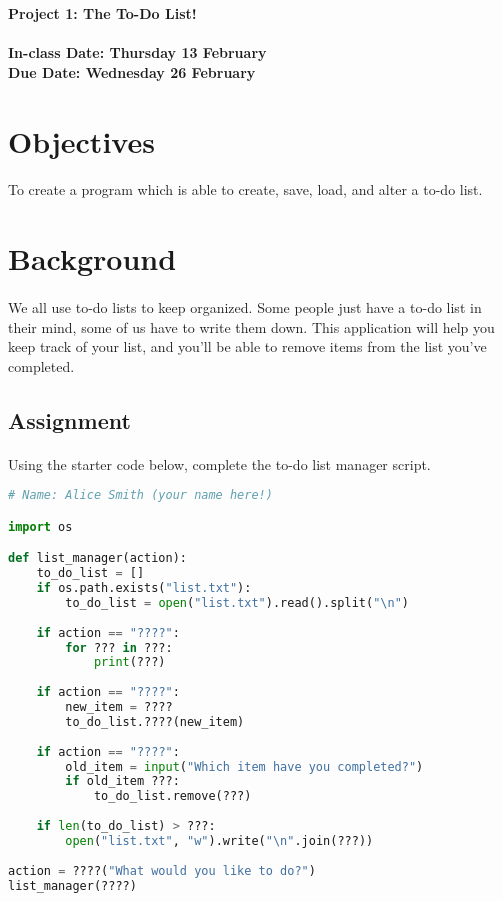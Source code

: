 \documentclass[letter,10pt]{article}
\begin{document}
    
    \huge
    \textbf{Project 1: The To-Do List!}
    \normalsize
    \\ ~~ \\
    \textbf{In-class Date: Thursday 13 February} \\
    \textbf{Due Date: Wednesday 26 February}
    
    \section*{Objectives}
    \paragraph{}To create a program which is able to create, save, load, and alter a to-do list.
    
    \section*{Background}
    \paragraph{}We all use to-do lists to keep organized. Some people just have a to-do list in their mind, some of us have to write them down. This application will help you keep track of your list, and you'll be able to remove items from the list you've completed.
    
    \subsection*{Assignment}
    \paragraph{}Using the starter code below, complete the to-do list manager script.
    
    \begin{lstlisting}[language=python]
# Name: Alice Smith (your name here!)

import os

def list_manager(action):
    to_do_list = []
    if os.path.exists("list.txt"):
        to_do_list = open("list.txt").read().split("\n")
    
    if action == "????":
        for ??? in ???:
            print(???)
    
    if action == "????":
        new_item = ????
        to_do_list.????(new_item)
    
    if action == "????":
        old_item = input("Which item have you completed?")
        if old_item ???:
            to_do_list.remove(???)
    
    if len(to_do_list) > ???:
        open("list.txt", "w").write("\n".join(???))
    
action = ????("What would you like to do?")
list_manager(????)
    \end{lstlisting}
    
\end{document}
